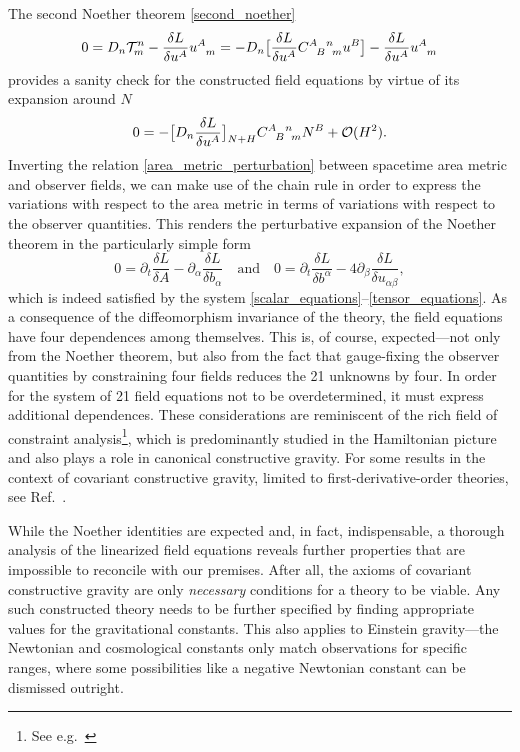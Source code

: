 The second Noether theorem \eqref{second_noether}
\begin{equation}
  0 = D_n \mathcal T^n_m - \frac{\delta L}{\delta u^A}u^A_{\hphantom Am} = - D_n \big\lbrack\frac{\delta L}{\delta u^A} \gmc{A}{B}{n}{m} u^B\big\rbrack - \frac{\delta L}{\delta u^A}u^A_{\hphantom Am} 
\end{equation}
provides a sanity check for the constructed field equations by virtue of its expansion around $N$
\begin{equation}
  0 = -\big\lbrack D_n \frac{\delta L}{\delta u^A}\big\rbrack_{N+H} \gmc{A}{B}{n}{m} N^B + \mathcal O(H^2).
\end{equation}
Inverting the relation \eqref{area_metric_perturbation} between spacetime area metric and observer fields, we can make use of the chain rule in order to express the variations with respect to the area metric in terms of variations with respect to the observer quantities. This renders the perturbative expansion of the Noether theorem in the particularly simple form
\begin{equation}\label{second_noether_area_linear}
  0 = \partial_t \frac{\delta L}{\delta A} - \partial_\alpha \frac{\delta L}{\delta b_\alpha}\quad\text{and}\quad 0 = \partial_t\frac{\delta L}{\delta b^\alpha} - 4\partial_\beta\frac{\delta L}{\delta u_{\alpha\beta}},
\end{equation}
which is indeed satisfied by the system \eqref{scalar_equations}--\eqref{tensor_equations}. As a consequence of the diffeomorphism invariance of the theory, the field equations have four dependences among themselves. This is, of course, expected---not only from the Noether theorem, but also from the fact that gauge-fixing the observer quantities by constraining four fields reduces the 21 unknowns by four. In order for the system of 21 field equations not to be overdetermined, it must express additional dependences. These considerations are reminiscent of the rich field of constraint analysis\footnote{See e.g.\ \cite{}}, which is predominantly studied in the Hamiltonian picture and also plays a role in canonical constructive gravity. For some results in the context of covariant constructive gravity, limited to first-derivative-order theories, see Ref.\ \cite{}.

While the Noether identities are expected and, in fact, indispensable, a thorough analysis of the linearized field equations reveals further properties that are impossible to reconcile with our premises. After all, the axioms of covariant constructive gravity are only \emph{necessary} conditions for a theory to be viable. Any such constructed theory needs to be further specified by finding appropriate values for the gravitational constants. This also applies to Einstein gravity---the Newtonian and cosmological constants only match observations for specific ranges, where some possibilities like a negative Newtonian constant can be dismissed outright.

